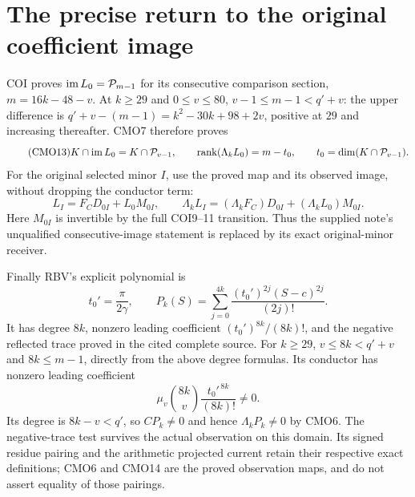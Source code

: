 \section{The precise return to the original coefficient image}
COI proves $\operatorname{im} L_0=\mathcal P_{m-1}$ for its consecutive
comparison section, $m=16k-48-v$. At $k\ge29$ and $0\le v\le80$,
$v-1\le m-1<q'+v$: the upper difference is
$q'+v-(m-1)=k^2-30k+98+2v$, positive at $29$
and increasing thereafter. CMO7 therefore proves
\begin{equation}\tag{CMO13}
 K\cap\operatorname{im} L_0=K\cap\mathcal P_{v-1},\qquad
 \operatorname{rank}(\Lambda_k L_0)=m-t_0,\qquad
 t_0=\dim(K\cap\mathcal P_{v-1}).
\end{equation}
For the original selected minor $I$, use the proved map
and its observed image, without dropping the conductor term:
\begin{equation}\tag{CMO14}
 \boxed{L_I=F_CD_{0I}+L_0M_{0I},\qquad
 \Lambda_kL_I=(\Lambda_kF_C)D_{0I}
                          +(\Lambda_kL_0)M_{0I}.}
\end{equation}
Here $M_{0I}$ is invertible by the full COI9--11 transition.
Thus the supplied note's unqualified consecutive-image statement
is replaced by its exact original-minor receiver.

Finally RBV's explicit polynomial \cite{a04cmo:RBV} is
\[
 t_0'=\frac{\pi}{2\gamma},\qquad
 P_k(S)=\sum_{j=0}^{4k}\frac{(t_0')^{2j}(S-c)^{2j}}{(2j)!}.
\]
It has degree $8k$, nonzero leading coefficient
$(t_0')^{8k}/(8k)!$, and the negative reflected trace proved
in the cited complete source. For $k\ge29$,
$v\le8k<q'+v$ and $8k\le m-1$, directly from the above
degree formulas. Its conductor has nonzero leading coefficient
\begin{equation}\tag{CMO15}
 \mu_v\binom{8k}{v}\frac{t_0'^{\,8k}}{(8k)!}\ne0 .
\end{equation}
Its degree is $8k-v<q'$, so $CP_k\ne0$ and hence
$\Lambda_kP_k\ne0$ by CMO6. The negative-trace test survives
the actual observation on this domain. Its signed residue
pairing and the arithmetic projected current retain their
respective exact definitions; CMO6 and CMO14 are the proved
observation maps, and do not assert equality of those pairings.



\endgroup

\endgroup
